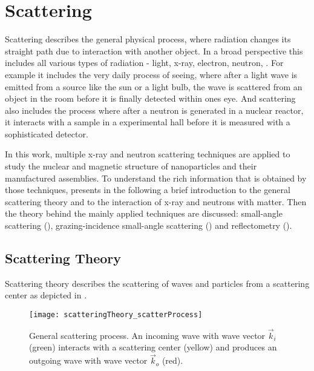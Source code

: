 \documentclass[\main/dresen_thesis.tex]{subfiles}
\begin{document}
\section{Scattering}\label{sec:theoreticalBackground:scattering}
Scattering describes the general physical process, where radiation changes its straight path due to interaction with another object.
In a broad perspective this includes all various types of radiation - light, x-ray, electron, neutron, \etc .
For example it includes the very daily process of seeing, where after a light wave is emitted from a source like the sun or a light bulb, the wave is scattered from an object in the room before it is finally detected within ones eye. 
And scattering also includes the process where after a neutron is generated in a nuclear reactor, it interacts with a sample in a experimental hall before it is measured with a sophisticated detector.

In this work, multiple x-ray and neutron scattering techniques are applied to study the nuclear and magnetic structure of nanoparticles and their manufactured assemblies. 
To understand the rich information that is obtained by those techniques,  presents in the following a brief introduction to the general scattering theory and  to the interaction of x-ray and neutrons with matter.
Then the theory behind the mainly applied techniques are discussed: small-angle scattering (), grazing-incidence small-angle scattering () and reflectometry ().
\subsection{Scattering Theory}\label{sec:theoreticalBackground:scattering:scatteringTheory}
Scattering theory describes the scattering of waves and particles from a scattering center as depicted in . 
\begin{figure}[tb]
  \centering
  \texttt{[image: scatteringTheory\_scatterProcess]}
  \caption{\label{fig:theoreticalBackground:scattering:scatteringTheory:scatteringProcess}General scattering process. An incoming wave with wave vector $\vec{k}_i$ (green) interacts with a scattering center (yellow) and produces an outgoing wave with wave vector $\vec{k}_o$ (red).}
\end{figure}
\end{document}
